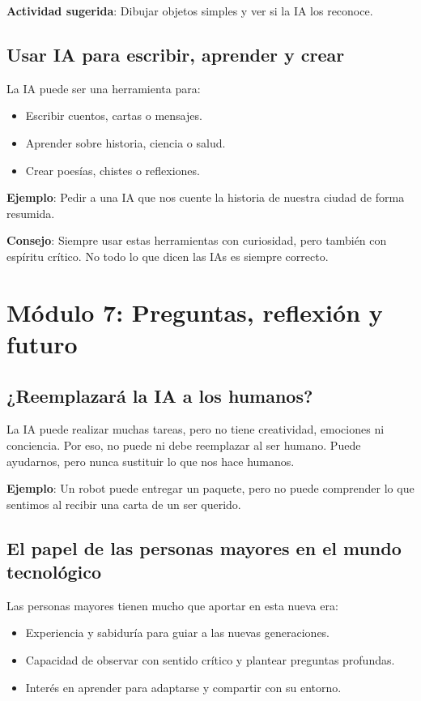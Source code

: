 \documentclass[12pt]{article}
\begin{document}
	\textbf{Actividad sugerida}: Dibujar objetos simples y ver si la IA los reconoce.
	
	\subsection*{Usar IA para escribir, aprender y crear}
	La IA puede ser una herramienta para:
	\begin{itemize}
		\item Escribir cuentos, cartas o mensajes.
		\item Aprender sobre historia, ciencia o salud.
		\item Crear poesías, chistes o reflexiones.
	\end{itemize}
	
	\textbf{Ejemplo}: Pedir a una IA que nos cuente la historia de nuestra ciudad de forma resumida.
	
	\textbf{Consejo}: Siempre usar estas herramientas con curiosidad, pero también con espíritu crítico. No todo lo que dicen las IAs es siempre correcto.
	
	\newpage
	
	\section{\textbf{\normalsize Módulo 7: Preguntas, reflexión y futuro}}
	
	\subsection*{¿Reemplazará la IA a los humanos?}
	La IA puede realizar muchas tareas, pero no tiene creatividad, emociones ni conciencia. Por eso, no puede ni debe reemplazar al ser humano. Puede ayudarnos, pero nunca sustituir lo que nos hace humanos.
	
	\textbf{Ejemplo}: Un robot puede entregar un paquete, pero no puede comprender lo que sentimos al recibir una carta de un ser querido.
	
	\subsection*{El papel de las personas mayores en el mundo tecnológico}
	Las personas mayores tienen mucho que aportar en esta nueva era:
	\begin{itemize}
		\item Experiencia y sabiduría para guiar a las nuevas generaciones.
		\item Capacidad de observar con sentido crítico y plantear preguntas profundas.
		\item Interés en aprender para adaptarse y compartir con su entorno.
	\end{itemize}
	
\end{document}
